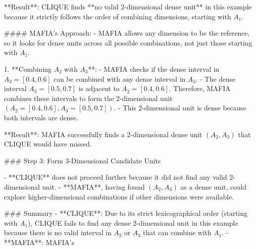**Result**: CLIQUE finds **no valid 2-dimensional dense unit** in this example because it strictly follows the order of combining dimensions, starting with \( A_1 \).

#### MAFIA’s Approach:
- MAFIA allows any dimension to be the reference, so it looks for dense units across all possible combinations, not just those starting with \( A_1 \).

1. **Combining \( A_2 \) with \( A_3 \)**:
   - MAFIA checks if the dense interval in \( A_2 = [0.4, 0.6] \) can be combined with any dense interval in \( A_3 \).
   - The dense interval \( A_3 = [0.5, 0.7] \) is adjacent to \( A_2 = [0.4, 0.6] \). Therefore, MAFIA combines these intervals to form the 2-dimensional unit \( (A_2 = [0.4, 0.6], A_3 = [0.5, 0.7]) \).
   - This 2-dimensional unit is dense because both intervals are dense.

**Result**: MAFIA successfully finds a 2-dimensional dense unit \( (A_2, A_3) \) that CLIQUE would have missed.

### Step 3: Form 3-Dimensional Candidate Units

- **CLIQUE** does not proceed further because it did not find any valid 2-dimensional unit.
- **MAFIA**, having found \( (A_2, A_3) \) as a dense unit, could explore higher-dimensional combinations if other dimensions were available.

### Summary
- **CLIQUE**: Due to its strict lexicographical order (starting with \( A_1 \)), CLIQUE fails to find any dense 2-dimensional unit in this example because there is no valid interval in \( A_2 \) or \( A_3 \) that can combine with \( A_1 \).
- **MAFIA**: MAFIA’s